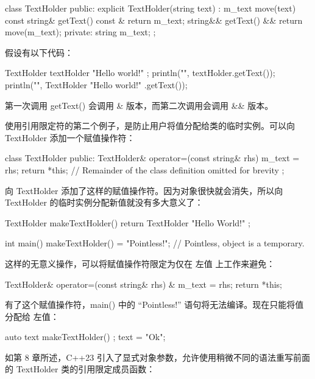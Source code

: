 \begin{cpp}
class TextHolder
{
    public:
        explicit TextHolder(string text) : m_text { move(text) } {}
        const string& getText() const & { return m_text; }
        string&& getText() && { return move(m_text); }
    private:
        string m_text;
};
\end{cpp}

假设有以下代码：

\begin{cpp}
TextHolder textHolder { "Hello world!" };
println("{}", textHolder.getText());
println("{}", TextHolder{ "Hello world!" }.getText());
\end{cpp}

第一次调用 getText() 会调用 \& 版本，而第二次调用会调用 \&\& 版本。

使用引用限定符的第二个例子，是防止用户将值分配给类的临时实例。可以向 TextHolder 添加一个赋值操作符：

\begin{cpp}
class TextHolder
{
    public:
        TextHolder& operator=(const string& rhs) { m_text = rhs; return *this; }
    // Remainder of the class definition omitted for brevity
};
\end{cpp}

向 TextHolder 添加了这样的赋值操作符。因为对象很快就会消失，所以向 TextHolder 的临时实例分配新值就没有多大意义了：

\begin{cpp}
TextHolder makeTextHolder() { return TextHolder { "Hello World!" }; }

int main()
{
    makeTextHolder() = "Pointless!"; // Pointless, object is a temporary.
}
\end{cpp}

这样的无意义操作，可以将赋值操作符限定为仅在 左值 上工作来避免：

\begin{cpp}
TextHolder& operator=(const string& rhs) & { m_text = rhs; return *this; }
\end{cpp}

有了这个赋值操作符，main() 中的 “Pointless!” 语句将无法编译。现在只能将值分配给 左值：

\begin{cpp}
auto text { makeTextHolder() };
text = "Ok";
\end{cpp}



如第 8 章所述，C++23 引入了显式对象参数，允许使用稍微不同的语法重写前面的 TextHolder 类的引用限定成员函数：


